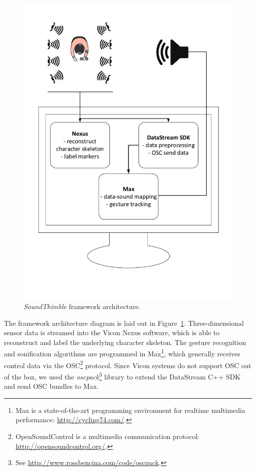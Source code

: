 \documentclass{nime-alternate}
\begin{document}

\begin{figure}[t]
	\centering
	\includegraphics[width=.75\columnwidth]{img/archi}
	\caption{\textit{SoundThimble} framework architecture.}
	\label{fig:archi}
\end{figure}

The framework architecture diagram is laid out in Figure~\ref{fig:archi}. Three-dimensional sensor data is streamed into the Vicon Nexus software, which is able to reconstruct and label the underlying character skeleton. The gesture recognition and sonification algorithms are programmed in Max\footnote{Max is a state-of-the-art programming environment for realtime multimedia performance: \url{http://cycling74.com/}.}, which generally receives control data via the OSC\footnote{OpenSoundControl is a multimedia communication protocol: \url{http://opensoundcontrol.org/}.} protocol. Since Vicon systems do not support OSC out of the box, we used the \textit{oscpack}\footnote{See \url{http://www.rossbencina.com/code/oscpack}.} library to extend the DataStream C++ SDK and send OSC bundles to Max.
\end{document}
